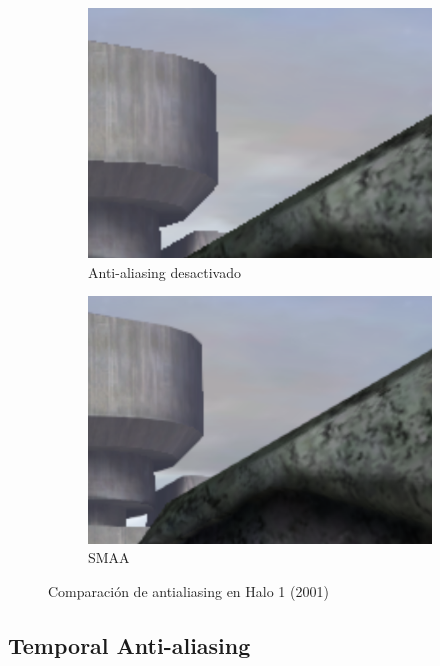 \documentclass[withindex, glossary]{cam-thesis}
\begin{document}
\begin{figure}[!htbp]
    \centering
    \begin{subfigure}[b]{0.8\textwidth}
        \includegraphics[width=\textwidth]{figures/smaaOFF.png}
        \caption{Anti-aliasing desactivado}
    \end{subfigure}
    \centering
    \begin{subfigure}[b]{0.8\textwidth}
        \includegraphics[width=\textwidth]{figures/smaaON.png}
        \caption{SMAA}
    \end{subfigure}
    \caption{Comparación de antialiasing en Halo 1 (2001)}
    \label{halo1}
\end{figure}

\subsection{Temporal Anti-aliasing}
\end{document}
